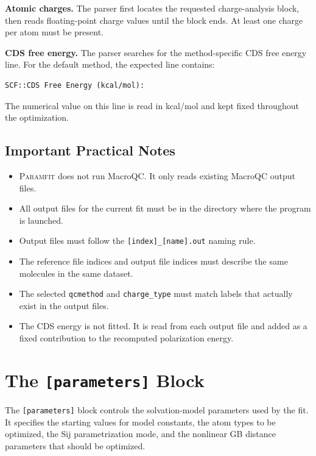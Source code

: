 \documentclass[11pt]{article}
\begin{document}
\textbf{Atomic charges.}
The parser first locates the requested charge-analysis block, then reads
floating-point charge values until the block ends. At least one charge per atom
must be present.

\textbf{CDS free energy.}
The parser searches for the method-specific CDS free energy line. For the
default method, the expected line contains:

\begin{lstlisting}
SCF::CDS Free Energy (kcal/mol):
\end{lstlisting}

The numerical value on this line is read in kcal/mol and kept fixed throughout
the optimization.

\subsection{Important Practical Notes}

\begin{itemize}[leftmargin=*]
  \item \textsc{Paramfit} does not run MacroQC. It only reads existing MacroQC
        output files.
  \item All output files for the current fit must be in the directory where the
        program is launched.
  \item Output files must follow the \texttt{[index]\_[name].out} naming rule.
  \item The reference file indices and output file indices must describe the
        same molecules in the same dataset.
  \item The selected \texttt{qcmethod} and \texttt{charge\_type} must match
        labels that actually exist in the output files.
  \item The CDS energy is not fitted. It is read from each output file and added
        as a fixed contribution to the recomputed polarization energy.
\end{itemize}

\section{The \texttt{[parameters]} Block}

The \texttt{[parameters]} block controls the solvation-model parameters used by
the fit. It specifies the starting values for model constants, the atom types to
be optimized, the Sij parametrization mode, and the nonlinear GB distance
parameters that should be optimized.
\end{document}
